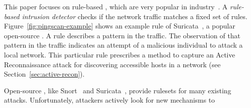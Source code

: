\documentclass[conference]{IEEEtran}
\begin{document}

This paper focuses on rule-based \nids{}, which are very popular in
industry~\cite{proofpoint-etpro,snort-rule-subscriptions}. A
\emph{rule-based intrusion detector} checks if the network traffic matches a fixed
set of rules. Figure~\ref{fig:pingscan-example} shows an example rule
of Suricata~\cite{suricata}, a popular open-source \nids{}. A rule
describes a pattern in the traffic. The observation of that pattern in
the traffic indicates an attempt of a malicious individual
to attack a local network. This particular rule prescribes a method to
capture an Active Reconnaissance attack for discovering accessible
hosts in a network (see Section~\ref{sec:active-recon}).

Open-source \nids{}, like Snort~\cite{snort} and
Suricata~\cite{suricata}, provide rulesets for many existing
attacks. Unfortunately, attackers actively look for new mechanisms to
\end{document}
